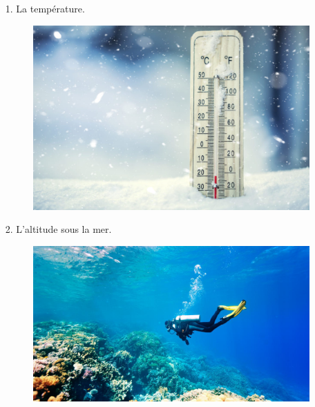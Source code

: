 \begin{multicols}{3}
\begin{enumerate}
  \item[1.] La température.
  \begin{figure}[H]
    \centering
    \includegraphics[width=0.8\linewidth]{5x3-nombres-relatifs-1-intro/c-temp.png}
  \end{figure}
  \item[2.] L'altitude sous la mer.
  \begin{figure}[H]
    \centering
    \includegraphics[width=0.8\linewidth]{5x3-nombres-relatifs-1-intro/c-plongee.png}
  \end{figure} \columnbreak


\end{enumerate}
\end{multicols}
